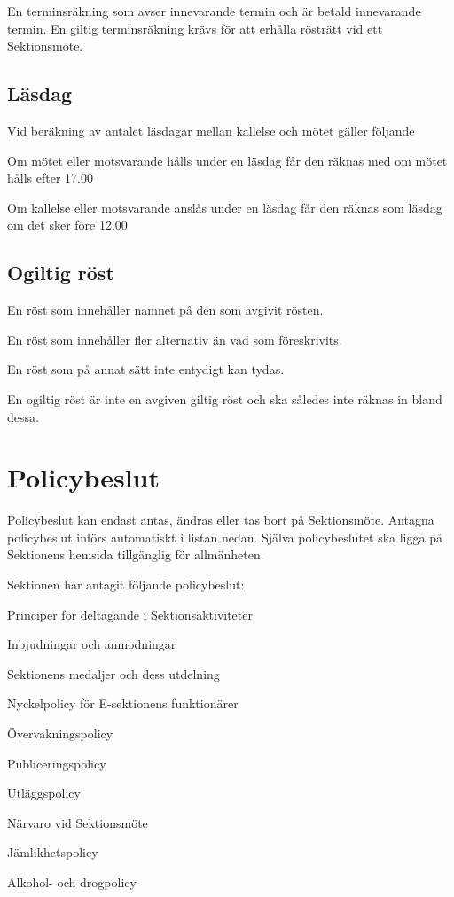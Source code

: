 \documentclass[10pt]{article}
\begin{document}
En terminsräkning som avser innevarande termin och är betald innevarande
termin. En giltig terminsräkning krävs för att erhålla rösträtt vid ett
Sektionsmöte.

\subsection{Läsdag}
Vid beräkning av antalet läsdagar mellan kallelse och mötet gäller följande
\begin{emptylist}
\item Om mötet eller motsvarande hålls under en läsdag får den räknas med om
    mötet hålls efter 17.00
\item Om kallelse eller motsvarande anslås under en läsdag får den räknas som
    läsdag om det sker före 12.00
\end{emptylist}

\subsection{Ogiltig röst}
\begin{emptylist}
\item En röst som innehåller namnet på den som avgivit rösten.
\item En röst som innehåller fler alternativ än vad som föreskrivits.
\item En röst som på annat sätt inte entydigt kan tydas.
\item En ogiltig röst är inte en avgiven giltig röst och ska således inte
    räknas in bland dessa.
\end{emptylist}

\newpage

\section{Policybeslut}
Policybeslut kan endast antas, ändras eller tas bort på Sektionsmöte. Antagna policybeslut införs automatiskt i listan nedan. Själva policybeslutet ska ligga på Sektionens hemsida tillgänglig för allmänheten.

Sektionen har antagit följande policybeslut:
\begin{dashlist}
    \item Principer för deltagande i Sektionsaktiviteter
    \item Inbjudningar och anmodningar
    \item Sektionens medaljer och dess utdelning
    \item Nyckelpolicy för E-sektionens funktionärer
    \item Övervakningspolicy
    \item Publiceringspolicy
    \item Utläggspolicy
    \item Närvaro vid Sektionsmöte
    \item Jämlikhetspolicy
    \item Alkohol- och drogpolicy
\end{dashlist}
\end{document}
